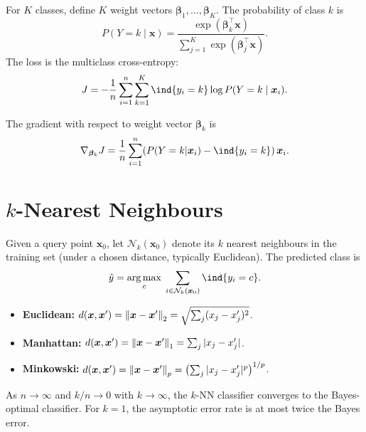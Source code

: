 \begin{definition}
For $K$ classes, define $K$ weight vectors $\bm{\beta}_1,\ldots,\bm{\beta}_K$. The probability of class $k$ is
\[
    P(Y = k \mid \bm{x}) = \frac{\exp(\bm{\beta}_k^\top \bm{x})}{\sum_{j=1}^{K}\exp(\bm{\beta}_j^\top \bm{x})}.
\]
The loss is the multiclass cross-entropy:
\[
    J = -\frac{1}{n}\sum_{i=1}^{n}\sum_{k=1}^{K} \ind\{y_i = k\}\log P(Y=k\mid\bm{x}_i).
\]
\end{definition}

\begin{proposition}
The gradient with respect to weight vector $\bm{\beta}_k$ is
\[
    \nabla_{\bm{\beta}_k} J = \frac{1}{n}\sum_{i=1}^{n}(P(Y=k|\bm{x}_i) - \ind\{y_i=k\})\,\bm{x}_i.
\]
\end{proposition}

\section{$k$-Nearest Neighbours}

\begin{definition}[$k$-NN Classifier]
Given a query point $\bm{x}_0$, let $\mathcal{N}_k(\bm{x}_0)$ denote its $k$ nearest neighbours in the training set (under a chosen distance, typically Euclidean). The predicted class is
\[
    \hat{y} = \argmax_{c}\;\sum_{i \in \mathcal{N}_k(\bm{x}_0)} \ind\{y_i = c\}.
\]
\end{definition}

\begin{definition}
\begin{itemize}
    \item \textbf{Euclidean:} $d(\bm{x},\bm{x}') = \left\| \bm{x}-\bm{x}' \right\|_2 = \sqrt{\sum_j(x_j-x_j')^2}$.
    \item \textbf{Manhattan:} $d(\bm{x},\bm{x}') = \left\| \bm{x}-\bm{x}' \right\|_1 = \sum_j |x_j-x_j'|$.
    \item \textbf{Minkowski:} $d(\bm{x},\bm{x}') = \left\| \bm{x}-\bm{x}' \right\|_p = \bigl(\sum_j |x_j-x_j'|^p\bigr)^{1/p}$.
\end{itemize}
\end{definition}

\begin{proposition}
As $n \to \infty$ and $k/n \to 0$ with $k \to \infty$, the $k$-NN classifier converges to the Bayes-optimal classifier. For $k=1$, the asymptotic error rate is at most twice the Bayes error.
\end{proposition}

